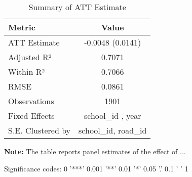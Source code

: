 \begin{table}[H]
\centering
\caption{Summary of ATT Estimate}
\label{tab:SA_hca_0p}
 \begin{center}
 \begin{tabular}{lc}
 \toprule
Metric & Value \\
\midrule
ATT Estimate & -0.0048 (0.0141) \\
\hline 
 Adjusted R² & 0.7071 \\
Within R² & 0.7066 \\
RMSE & 0.0861 \\
Observations & 1901 \\
\hline 
 Fixed Effects & school_id ,  year \\
S.E. Clustered by & school_id, road_id \\
\bottomrule
\end{tabular}
 \end{center}\begin{tablenotes}
\small
\item \textbf{Note:} The table reports panel estimates of the effect of ...
\item Significance codes: 0 '***' 0.001 '**' 0.01 '*' 0.05 '.' 0.1 ' ' 1
\end{tablenotes}
\end{table}